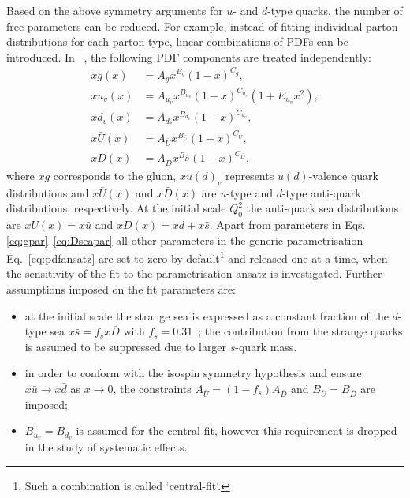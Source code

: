 Based on the above symmetry arguments for $u$- and $d$-type quarks, the number of free parameters can be reduced. For example, instead of fitting individual parton distributions for each parton type, linear combinations of PDFs can be introduced.  In ~\cite{Aaron:2009aa}, the following PDF components are treated independently:
\begin{align}
 xg\left(x\right) &= A_gx^{B_g}\left(1-x\right)^{C_g}, \label{eq:gpar} \\
 xu_v\left(x\right) &= A_{u_v}x^{B_{u_v}}\left(1-x\right)^{C_{u_v}}\left(1+E_{u_v}x^2\right),\\
 xd_v\left(x\right) &= A_{d_v}x^{B_{d_v}}\left(1-x\right)^{C_{d_v}},\\
 x\bar{U}\left(x\right) &= A_{\bar{U}}x^{B_{\bar{U}}}\left(1-x\right)^{C_{\bar{U}}},\\
 x\bar{D}\left(x\right) &= A_{\bar{D}}x^{B_{\bar{D}}}\left(1-x\right)^{C_{\bar{D}}}, \label{eq:Dseapar}
\end{align}
where $xg$ corresponds to the gluon, $xu\left(d\right)_v$ represents $u\left(d\right)$-valence quark distributions and $x\bar{U}\left(x\right)$ and $x\bar{D}\left(x\right)$ are $u$-type and $d$-type anti-quark distributions, respectively. At the initial scale $Q^2_0$ the anti-quark sea distributions are $x\bar{U}\left(x\right)=x\bar u$ and $x\bar{D}\left(x\right)=x\bar d+x\bar s$. Apart from parameters in Eqs.\eqref{eq:gpar}--\eqref{eq:Dseapar} all other parameters in the generic parametrisation Eq.~\eqref{eq:pdfansatz} are set to zero by default\footnote{Such a combination is called `central-fit`.} and released one at a time, when the sensitivity of the fit to the parametrisation ansatz is investigated. Further assumptions imposed on the fit parameters are:
\begin{itemize}
 \item at the initial scale the strange sea is expressed as a constant fraction of the $d$-type sea $x\bar s=f_s x \bar D$ with $f_s=0.31$~\cite{Martin:2009iq,Nadolsky:2008zw}; the contribution from the strange quarks is assumed to be suppressed due to larger $s$-quark mass.
 \item in order to conform with the isospin symmetry hypothesis and ensure $x\bar u \rightarrow x\bar d$ as $x\rightarrow 0$, the constraints $A_{\bar U}=\left(1-f_s\right)A_{\bar D}$ and $B_{\bar{U}}=B_{\bar{D}}$ are imposed;
 \item $B_{u_v}=B_{d_v}$ is assumed for the central fit, however this requirement is dropped in the study of systematic effects.
\end{itemize}
